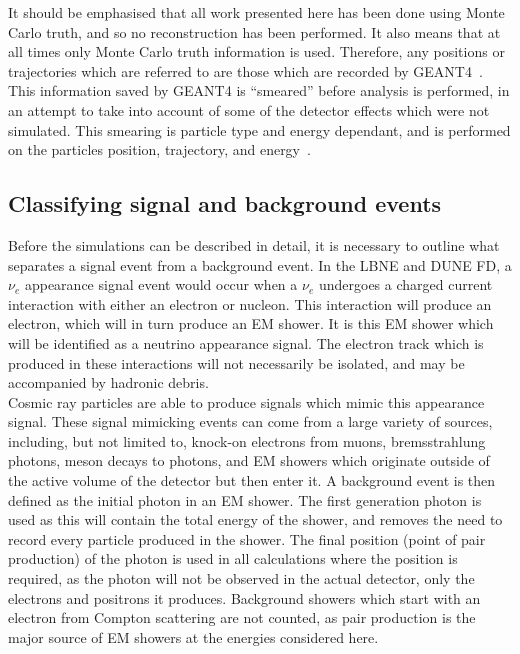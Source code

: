 It should be emphasised that all work presented here has been done using Monte Carlo truth, and so no reconstruction has been performed. It also means that at all times only Monte Carlo truth information is used. Therefore, any positions or trajectories which are referred to are those which are recorded by GEANT4~\citep{GEANT4}. This information saved by GEANT4 is ``smeared'' before analysis is performed, in an attempt to take into account of some of the detector effects which were not simulated. This smearing is particle type and energy dependant, and is performed on the particles position, trajectory, and energy~\citep{MartinsThesis, LBNE7806}. \\

\subsection{Classifying signal and background events}
Before the simulations can be described in detail, it is necessary to outline what separates a signal event from a background event. In the LBNE and DUNE FD, a $\nu_{e}$ appearance signal event would occur when a $\nu_{e}$ undergoes a charged current interaction with either an electron or nucleon. This interaction will produce an electron, which will in turn produce an EM shower. It is this EM shower which will be identified as a neutrino appearance signal. The electron track which is produced in these interactions will not necessarily be isolated, and may be accompanied by hadronic debris. \\

Cosmic ray particles are able to produce signals which mimic this appearance signal. These signal mimicking events can come from a large variety of sources, including, but not limited to, knock-on electrons from muons, bremsstrahlung photons, meson decays to photons, and EM showers which originate outside of the active volume of the detector but then enter it. A background event is then defined as the initial photon in an EM shower. The first generation photon is used as this will contain the total energy of the shower, and removes the need to record every particle produced in the shower. The final position (point of pair production) of the photon is used in all calculations where the position is required, as the photon will not be observed in the actual detector, only the electrons and positrons it produces. Background showers which start with an electron from Compton scattering are not counted, as pair production is the major source of EM showers at the energies considered here. \\


